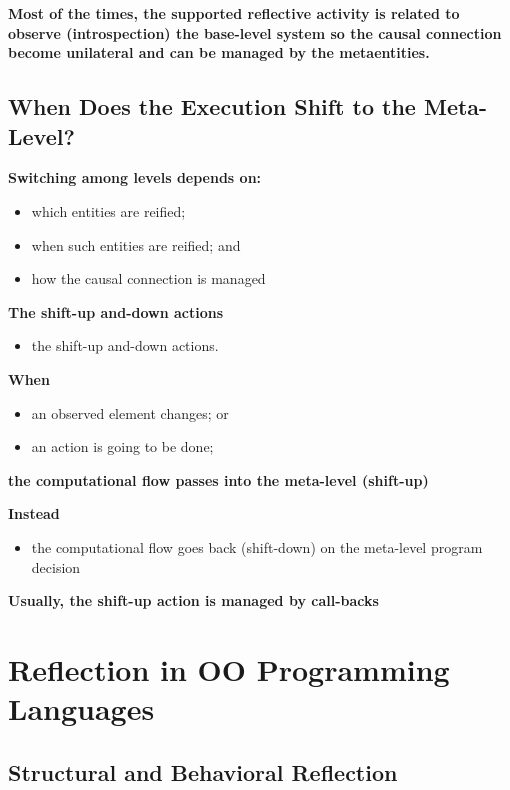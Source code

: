 \textbf{Most of the times, the supported reflective activity is related to observe (introspection) the base-level system so the causal connection become unilateral and can be managed by the metaentities.}

\subsection{When Does the Execution Shift to the Meta-Level?}
\textbf{Switching among levels depends on:}
\begin{itemize}
	\item which entities are reified;
	\item when such entities are reified; and
	\item how the causal connection is managed
\end{itemize}

\textbf{The shift-up and-down actions}
\begin{itemize}
	\item the shift-up and-down actions.
\end{itemize}

\textbf{When}
\begin{itemize}
	\item an observed element changes; or
	\item an action is going to be done;
\end{itemize}

\textbf{the computational flow passes into the meta-level (shift-up)}

\textbf{Instead}
\begin{itemize}
	\item the computational flow goes back (shift-down) on the meta-level program decision
\end{itemize}

\textbf{Usually, the shift-up action is managed by call-backs}

\section{Reflection in OO Programming Languages}

\subsection{Structural and Behavioral Reflection}

